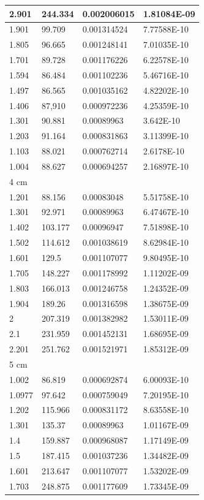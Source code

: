 \documentclass{article}
\begin{document}
\begin{longtable}{|l|l|l|l|}
        2.901 & 244.334 & 0.002006015 & 1.81084E-09 \\ \hline
        1.901 & 99.709 & 0.001314524 & 7.77588E-10 \\ \hline
        1.805 & 96.665 & 0.001248141 & 7.01035E-10 \\ \hline
        1.701 & 89.728 & 0.001176226 & 6.22578E-10 \\ \hline
        1.594 & 86.484 & 0.001102236 & 5.46716E-10 \\ \hline
        1.497 & 86.565 & 0.001035162 & 4.82202E-10 \\ \hline
        1.406 & 87,910 & 0.000972236 & 4.25359E-10 \\ \hline
        1.301 & 90.881 & 0.00089963 & 3.642E-10 \\ \hline
        1.203 & 91.164 & 0.000831863 & 3.11399E-10 \\ \hline
        1.103 & 88.021 & 0.000762714 & 2.6178E-10 \\ \hline
        1.004 & 88.627 & 0.000694257 & 2.16897E-10 \\ \hline
        4 cm & ~ & ~ & ~ \\ \hline
        1.201 & 88.156 & 0.00083048 & 5.51758E-10 \\ \hline
        1.301 & 92.971 & 0.00089963 & 6.47467E-10 \\ \hline
        1.402 & 103.177 & 0.00096947 & 7.51898E-10 \\ \hline
        1.502 & 114.612 & 0.001038619 & 8.62984E-10 \\ \hline
        1.601 & 129.5 & 0.001107077 & 9.80495E-10 \\ \hline
        1.705 & 148.227 & 0.001178992 & 1.11202E-09 \\ \hline
        1.803 & 166.013 & 0.001246758 & 1.24352E-09 \\ \hline
        1.904 & 189.26 & 0.001316598 & 1.38675E-09 \\ \hline
        2 & 207.319 & 0.001382982 & 1.53011E-09 \\ \hline
        2.1 & 231.959 & 0.001452131 & 1.68695E-09 \\ \hline
        2.201 & 251.762 & 0.001521971 & 1.85312E-09 \\ \hline
        5 cm & ~ & ~ & ~ \\ \hline
        1.002 & 86.819 & 0.000692874 & 6.00093E-10 \\ \hline
        1.0977 & 97.642 & 0.000759049 & 7.20195E-10 \\ \hline
        1.202 & 115.966 & 0.000831172 & 8.63558E-10 \\ \hline
        1.301 & 135.37 & 0.00089963 & 1.01167E-09 \\ \hline
        1.4 & 159.887 & 0.000968087 & 1.17149E-09 \\ \hline
        1.5 & 187.415 & 0.001037236 & 1.34482E-09 \\ \hline
        1.601 & 213.647 & 0.001107077 & 1.53202E-09 \\ \hline
        1.703 & 248.875 & 0.001177609 & 1.73345E-09 \\ \hline
    \end{longtable}
\end{document}
